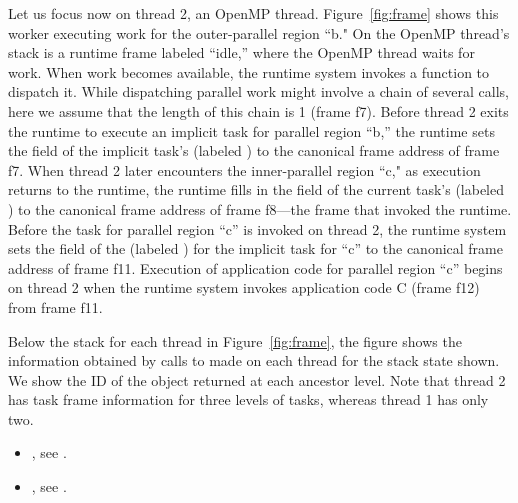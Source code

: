 Let us focus now on thread 2, an OpenMP thread. Figure~\ref{fig:frame}
shows this worker executing work for the outer-parallel region ``b."
On the OpenMP thread's stack is a runtime frame labeled ``idle,''
where the OpenMP thread waits for work.  When work becomes available,
the runtime system invokes a function to dispatch it. While
dispatching parallel work might involve a chain of several calls, here
we assume that the length of this chain is 1 (frame f7).  Before
thread 2 exits the runtime to execute an implicit task for parallel
region ``b,'' the runtime sets the  field of the
implicit task's  (labeled ) to the canonical frame address of frame f7.
When thread 2 later encounters the inner-parallel region ``c," as
execution returns to the runtime, the runtime fills in the
 field of the current task's 
(labeled ) to the canonical frame address of frame f8---the frame that invoked the
runtime. Before the task for parallel region ``c'' is invoked on
thread 2, the runtime system sets the  field of the
 (labeled ) for the implicit task for
``c'' to the canonical frame address of frame f11. Execution of application code for parallel region
``c'' begins on thread 2 when the runtime system invokes application
code C (frame f12) from frame f11.


Below the stack for each thread in Figure~\ref{fig:frame}, the figure
shows the  information obtained by calls to
 made on each thread for the stack state
shown. We show the ID of the  object returned at
each ancestor level. Note that thread 2 has task frame information for
three levels of tasks, whereas thread 1 has only two.

\crossreferences
\begin{itemize}
\item {}, see .
\item {}, see .
\end{itemize}



